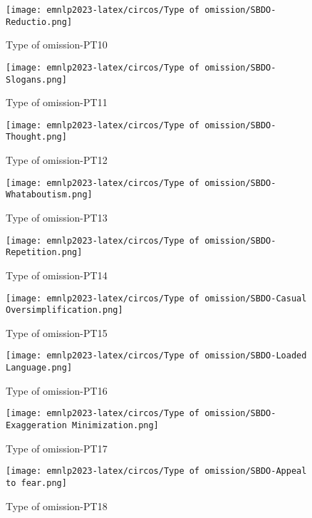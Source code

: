 \begin{figure*}[htbp]
    \begin{subfigure}[b]{0.33\textwidth}
    \centering
        \texttt{[image: emnlp2023-latex/circos/Type of omission/SBDO-Reductio.png]}
        \caption{Type of omission-PT10}
    \end{subfigure}
    \begin{subfigure}[b]{0.33\textwidth}
    \centering
        \texttt{[image: emnlp2023-latex/circos/Type of omission/SBDO-Slogans.png]}
        \caption{Type of omission-PT11}
    \end{subfigure}    
    \begin{subfigure}[b]{0.33\textwidth}
    \centering
        \texttt{[image: emnlp2023-latex/circos/Type of omission/SBDO-Thought.png]}
        \caption{Type of omission-PT12}
    \end{subfigure}
    \begin{subfigure}[b]{0.33\textwidth}
    \centering
        \texttt{[image: emnlp2023-latex/circos/Type of omission/SBDO-Whataboutism.png]}
        \caption{Type of omission-PT13}
    \end{subfigure}
    \begin{subfigure}[b]{0.33\textwidth}
    \centering
        \texttt{[image: emnlp2023-latex/circos/Type of omission/SBDO-Repetition.png]}
        \caption{Type of omission-PT14}
    \end{subfigure}
    \begin{subfigure}[b]{0.33\textwidth}
    \centering
        \texttt{[image: emnlp2023-latex/circos/Type of omission/SBDO-Casual Oversimplification.png]}
        \caption{Type of omission-PT15}
    \end{subfigure}
    \begin{subfigure}[b]{0.33\textwidth}
    \centering
        \texttt{[image: emnlp2023-latex/circos/Type of omission/SBDO-Loaded Language.png]}
        \caption{Type of omission-PT16}
    \end{subfigure}
    \begin{subfigure}[b]{0.33\textwidth}
    \centering
        \texttt{[image: emnlp2023-latex/circos/Type of omission/SBDO-Exaggeration Minimization.png]}
        \caption{Type of omission-PT17}
    \end{subfigure}
    \begin{subfigure}[b]{0.33\textwidth}
    \centering
        \texttt{[image: emnlp2023-latex/circos/Type of omission/SBDO-Appeal to fear.png]}
        \caption{Type of omission-PT18}
    \end{subfigure}
\end{figure*}
